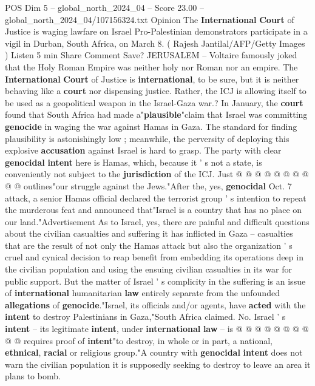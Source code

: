 \begin{textsample}{POS Dim 5 – global\_north\_2024\_04 – Score 23.00 – global\_north\_2024\_04/107156324.txt}  \label{ex:f5_pos_261}
Opinion The \textbf{International} \textbf{Court} of Justice is waging lawfare on Israel Pro-Palestinian demonstrators participate in a vigil in Durban, South Africa, on March 8. ( Rajesh Jantilal/AFP/Getty Images ) Listen 5 min Share Comment Save?
JERUSALEM -- Voltaire famously joked that the Holy Roman Empire was neither holy nor Roman nor an empire.
The \textbf{International} \textbf{Court} of Justice is \textbf{international}, to be sure, but it is neither behaving like a \textbf{court} nor dispensing justice.
Rather, the ICJ is allowing itself to be used as a geopolitical weapon in the Israel-Gaza war.?
In January, the \textbf{court} found that South Africa had made a"\textbf{plausible}"claim that Israel was committing \textbf{genocide} in waging the war against Hamas in Gaza.
The standard for finding plausibility is astonishingly low ; meanwhile, the perversity of deploying this explosive \textbf{accusation} against Israel is hard to grasp.
The party with clear \textbf{genocidal} \textbf{intent} here is Hamas, which, because it ' s not a state, is conveniently not subject to the \textbf{jurisdiction} of the ICJ.
Just @ @ @ @ @ @ @ @ @ @ outlines"our struggle against the Jews."After the, yes, \textbf{genocidal} Oct. 7 attack, a senior Hamas official declared the terrorist group ' s intention to repeat the murderous feat and announced that"Israel is a country that has no place on our land."Advertisement As to Israel, yes, there are painful and difficult questions about the civilian casualties and suffering it has inflicted in Gaza -- casualties that are the result of not only the Hamas attack but also the organization ' s cruel and cynical decision to reap benefit from embedding its operations deep in the civilian population and using the ensuing civilian casualties in its war for public support.
But the matter of Israel ' s complicity in the suffering is an issue of \textbf{international} humanitarian \textbf{law} entirely separate from the unfounded \textbf{allegations} of \textbf{genocide}."Israel, its officials and/or agents, have \textbf{acted} with the \textbf{intent} to destroy Palestinians in Gaza,"South Africa claimed.
No.
Israel ' s \textbf{intent} -- its legitimate \textbf{intent}, under \textbf{international} \textbf{law} -- is @ @ @ @ @ @ @ @ @ @ requires proof of \textbf{intent}"to destroy, in whole or in part, a national, \textbf{ethnical}, \textbf{racial} or religious group."A country with \textbf{genocidal} \textbf{intent} does not warn the civilian population it is supposedly seeking to destroy to leave an area it plans to bomb.

\end{textsample}
